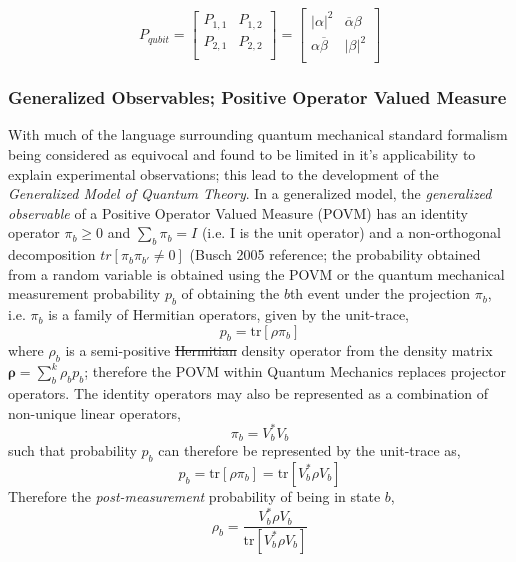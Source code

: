 \documentclass[7pt]{article}
\begin{document}
$$
P_{qubit} =
\left[
  \begin{array}{cc}
    P_{1,1} & P_{1,2}  \\
    P_{2,1}  & P_{2,2}  \\
  \end{array}
\right]
=
\left[
  \begin{array}{cc}
  |\alpha|^2 & \overline{\alpha} \beta \\
    \alpha \overline{\beta}  & |\beta|^2   \\
  \end{array}
\right]
$$
\subsubsection{Generalized Observables; Positive Operator Valued Measure}
With much of the language surrounding quantum mechanical standard formalism being considered as equivocal and found to be limited in it's applicability to explain experimental observations; this lead to the development of the \emph{Generalized Model of Quantum Theory}. In a generalized model, the \emph{generalized observable} of a Positive Operator Valued Measure (POVM) has an identity operator $\pi_b \geq 0$ and $\sum_{b} \pi_b = I$ (i.e. I is the unit operator) and a non-orthogonal decomposition $tr [\pi_b \pi_{b'} \neq 0]$ (Busch 2005 reference; the probability obtained from a random variable is obtained using the POVM or the quantum mechanical measurement probability $p_b$ of obtaining the $b$th event under the projection $\pi_{b}$, i.e. $\pi_b$ is a family of Hermitian operators, given by the unit-trace,
\begin{equation}
p_b = \text{tr}[ \rho \pi_b]
\end{equation}
where $\rho_b$  is a semi-positive \st{Hermitian} density operator from the density matrix $\mathbf{\rho} = \sum_b^k \rho_b p_b$; therefore the POVM within Quantum Mechanics replaces projector operators. The identity operators may also be represented as a combination of non-unique linear operators,
\begin{equation}
\pi_b = V_b^{*} V_b
\end{equation}
such that probability $p_b$ can therefore be represented by the unit-trace as,
\begin{equation}
p_b = \text{tr}[ \rho \pi_b] = \text{tr}[ V_b^{*} \rho V_b]
\end{equation}
Therefore the \emph{post-measurement} probability of being in state $b$,
\begin{equation}
\rho_b = \dfrac{V_b^{*} \rho V_b}{\text{tr}[ V_b^{*} \rho V_b]}
\end{equation}
\end{document}
